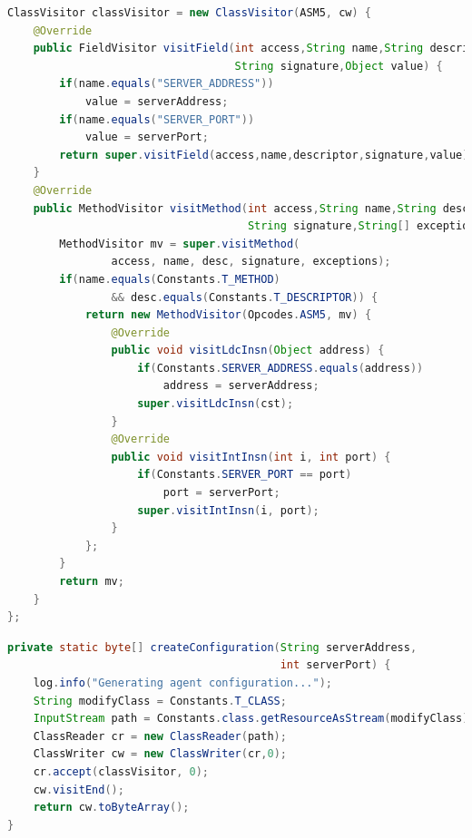 \begin{lstlisting}[language=Java, style=Oracle, columns=fullflexible,
caption=Agent (Client-Side) Java Bytecode Manipulation,
captionpos=b]
ClassVisitor classVisitor = new ClassVisitor(ASM5, cw) {
    @Override
    public FieldVisitor visitField(int access,String name,String descriptor,
                                   String signature,Object value) {
        if(name.equals("SERVER_ADDRESS"))
            value = serverAddress;
        if(name.equals("SERVER_PORT"))
            value = serverPort;
        return super.visitField(access,name,descriptor,signature,value);
    }
    @Override
    public MethodVisitor visitMethod(int access,String name,String desc,
                                     String signature,String[] exceptions) {
        MethodVisitor mv = super.visitMethod(
                access, name, desc, signature, exceptions);
        if(name.equals(Constants.T_METHOD)
                && desc.equals(Constants.T_DESCRIPTOR)) {
            return new MethodVisitor(Opcodes.ASM5, mv) {
                @Override
                public void visitLdcInsn(Object address) {
                    if(Constants.SERVER_ADDRESS.equals(address))
                        address = serverAddress;
                    super.visitLdcInsn(cst);
                }
                @Override
                public void visitIntInsn(int i, int port) {
                    if(Constants.SERVER_PORT == port)
                        port = serverPort;
                    super.visitIntInsn(i, port);
                }
            };
        }
        return mv;
    }
};
\end{lstlisting}

\newpage

\begin{lstlisting}[language=Java, label={lst:agent-configuration}, style=Oracle, columns=fullflexible,
caption=Agent (Client-Side) Configuration Creation,
captionpos=b]
private static byte[] createConfiguration(String serverAddress,
                                          int serverPort) {
    log.info("Generating agent configuration...");
    String modifyClass = Constants.T_CLASS;
    InputStream path = Constants.class.getResourceAsStream(modifyClass);
    ClassReader cr = new ClassReader(path);
    ClassWriter cw = new ClassWriter(cr,0);
    cr.accept(classVisitor, 0);
    cw.visitEnd();
    return cw.toByteArray();
}
\end{lstlisting}

